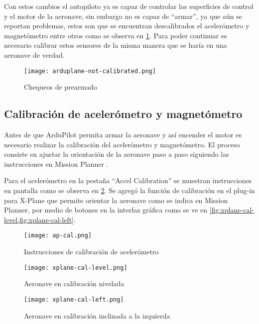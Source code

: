 Con estos cambios el autopiloto ya es capaz de controlar las superficies de control y el motor de la aeronave, sin embargo no es capaz de ``armar”, ya que aún se reportan problemas, estos son que se encuentran descalibrados el acelerómetro y magnetómetro entre otros como se observa en \cref{fig:arduplane-not-calibrated}. Para poder continuar es necesario calibrar estos sensores de la misma manera que se haría en una aeronave de verdad.

\begin{figure}[h]
    \centering
    \texttt{[image: arduplane-not-calibrated.png]}
    \caption{Chequeos de prearmado}
    \label{fig:arduplane-not-calibrated}
\end{figure}

\subsection{Calibración de acelerómetro y magnetómetro}

Antes de que ArduPilot permita armar la aeronave y así encender el motor es necesario realizar la calibración del acelerómetro y magnetómetro. El proceso consiste en ajustar la orientación de la aeronave paso a paso siguiendo las instrucciones en Mission Planner \cite{arduplane-accelerometer}.

Para el acelerómetro en la pestaña ``Accel Calibration'' se muestran instrucciones en pantalla como se observa en \cref{fig:ap-cal}. Se agregó la función de calibración en el plug-in para X-Plane que permite orientar la aeronave como se indica en Mission Planner, por medio de botones en la interfaz gráfica como se ve en \cref{fig:xplane-cal-level,fig:xplane-cal-left}.

\begin{figure}[h]
    \centering
    \texttt{[image: ap-cal.png]}
    \caption{Instrucciones de calibración de acelerómetro}
    \label{fig:ap-cal}
\end{figure}

\begin{figure}[h]
    \centering
    \texttt{[image: xplane-cal-level.png]}
    \caption{Aeronave en calibración nivelada}
    \label{fig:xplane-cal-level}
\end{figure}

\begin{figure}[h]
    \centering
    \texttt{[image: xplane-cal-left.png]}
    \caption{Aeronave en calibración inclinada a la izquierda}
    \label{fig:xplane-cal-left}
\end{figure}

